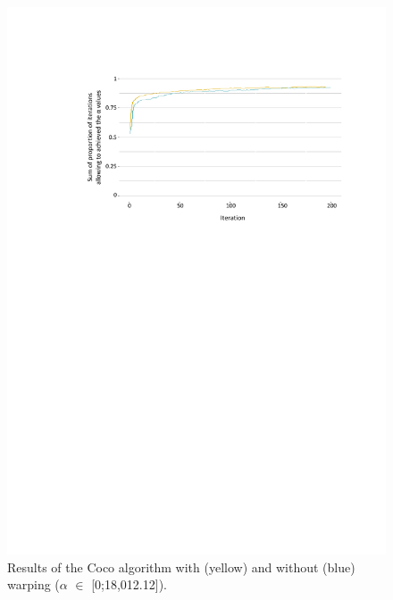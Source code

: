 	\begin{figure}[!ht]
		\centering
		\includegraphics[trim = 4cm 16.6cm 2.2cm 3.5cm, clip, width=\textwidth]{Figures_Warping_resultats_courbes_algoCoco_0_18000.pdf}
		\caption{Results of the Coco algorithm with (yellow) and without (blue) warping ($\alpha$ $\in$ [0;18,012.12]).}\label{fig:algococo0}
	\end{figure}
	
